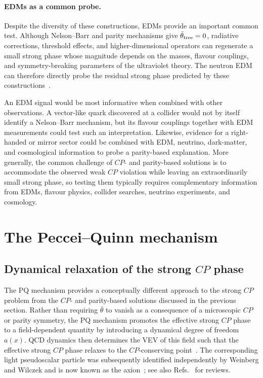 \documentclass[review]{elsarticle}
\numberwithin{equation}{section}
\numberwithin{table}{section}
\numberwithin{figure}{section}
\begin{document}
\paragraph{EDMs as a common probe.}

Despite the diversity of these constructions, EDMs provide an important common test. Although Nelson--Barr and parity mechanisms give $\bar\theta_{\rm tree}=0$, radiative corrections, threshold effects, and higher-dimensional operators can regenerate a small strong phase whose magnitude depends on the masses, flavour couplings, and symmetry-breaking parameters of the ultraviolet theory. The neutron EDM can therefore directly probe the residual strong phase predicted by these constructions~\cite{Dine:2015jga,Valenti:2021rdu,Mimura:2019yfi,Craig:2020bnv,Carrasco-Martinez:2023nit,Murgui:2025scx,Alves:2026hog,Bonnefoy:2025rvo}.

An EDM signal would be most informative when combined with other observations. A vector-like quark discovered at a collider would not by itself identify a Nelson--Barr mechanism, but its flavour couplings together with EDM measurements could test such an interpretation. Likewise, evidence for a right-handed or mirror sector could be combined with EDM, neutrino, dark-matter, and cosmological information to probe a parity-based explanation. More generally, the common challenge of $CP$- and parity-based solutions is to accommodate the observed weak $CP$ violation while leaving an extraordinarily small strong phase, so testing them typically requires complementary information from EDMs, flavour physics, collider searches, neutrino experiments, and cosmology.

\section{The Peccei--Quinn mechanism} \label{sec:pq-mechanism}

\subsection{Dynamical relaxation of the strong \texorpdfstring{$CP$}{CP} phase}
\label{sec:PQ-dynamical-relaxation}

The PQ mechanism provides a conceptually different approach to the strong $CP$ problem from the $CP$- and parity-based solutions discussed in the previous section. Rather than requiring $\bar\theta$ to vanish as a consequence of a microscopic $CP$ or parity symmetry, the PQ mechanism promotes the effective strong $CP$ phase to a field-dependent quantity by introducing a dynamical degree of freedom $a(x)$. QCD dynamics then determines the VEV of this field such that the effective strong $CP$ phase relaxes to the $CP$-conserving point~\cite{Peccei:1977hh,Peccei:1977ur}. The corresponding light pseudoscalar particle was subsequently identified independently by Weinberg and Wilczek and is now known as the axion~\cite{Weinberg:1977ma,Wilczek:1977pj}; see also Refs.~\cite{Peccei:2006as,Kim:2008hd,Hook:2018dlk,DiLuzio:2020wdo} for reviews.
\end{document}
